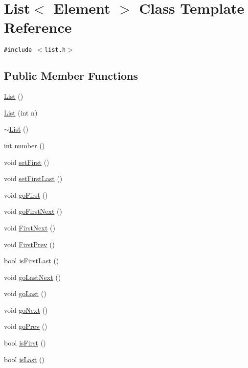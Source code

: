 \hypertarget{classList}{
\section{List$<$ Element $>$ Class Template Reference}
\label{classList}
}
{\tt \#include $<$list.h$>$}

\subsection*{Public Member Functions}
\begin{CompactItemize}
\item 
\hyperlink{classList_cdfa9a2a43d22f973fe2ecc55318847a}{List} ()
\item 
\hyperlink{classList_2115cdf859728c641b7426ccd29036a5}{List} (int n)
\item 
\hyperlink{classList_d60d01b9c7003b77fd3370a7f3468a62}{$\sim$List} ()
\item 
int \hyperlink{classList_b9c6ee975d247a73b16a72c509596c0e}{number} ()
\item 
void \hyperlink{classList_79098dd3b93d00c5d2d4fa7f7cfcfd7e}{setFirst} ()
\item 
void \hyperlink{classList_283cd30e6cdd0223d137b2a0ff77bfe1}{setFirstLast} ()
\item 
void \hyperlink{classList_6157f161c709d4ffea0e021d99c212cd}{goFirst} ()
\item 
void \hyperlink{classList_e3565e27cc863240e43808e7278dad2f}{goFirstNext} ()
\item 
void \hyperlink{classList_6826ef4c46c838156e9cbb839b4ae20f}{FirstNext} ()
\item 
void \hyperlink{classList_841b8ba447b229dafa684faa36cd23ae}{FirstPrev} ()
\item 
bool \hyperlink{classList_a51d4b73577c4875f1c4ad82b7aa388c}{isFirstLast} ()
\item 
void \hyperlink{classList_60201d0166b5481b1eb178d3b4f5c5ef}{goLastNext} ()
\item 
void \hyperlink{classList_8c492b1f7cbd39c780785a4e9720f9f7}{goLast} ()
\item 
void \hyperlink{classList_1bec5a68e53c10d76d5286d19c1b52e0}{goNext} ()
\item 
void \hyperlink{classList_655c3217de571cbb357c20285692e86d}{goPrev} ()
\item 
bool \hyperlink{classList_3cdb77229517a14bd028316d401be814}{isFirst} ()
\item 
bool \hyperlink{classList_72c834a30a14c91afbcb4a23537a7a95}{isLast} ()

\end{CompactItemize}
